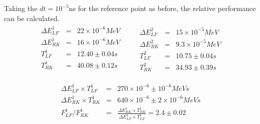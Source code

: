 \documentclass[a4paper,oneside,12pt]{report}
\numberwithin{equation}{chapter}
\begin{document}
Taking the $dt=10^{-5}$ns for the reference point as before, the relative performance can be calculated.
\begin{eqnarray*}
    \begin{aligned}
        \Delta E_{LF}^1 &=& 22 \times 10^{-6} MeV \\
        \Delta E_{RK}^1 &=& 16 \times 10^{-6} MeV \\
        T_{LF}^1 &=& 12.40 \pm 0.04 s \\
        T_{RK}^1 &=& 40.08 \pm 0.12 s \\
    \end{aligned}
    \qquad
    \begin{aligned}
        \Delta E_{LF}^2 &=& 15 \times 10^{-5} MeV \\
        \Delta E_{RK}^2 &=& 9.3 \times 10^{-5} MeV \\
        T_{LF}^2 &=& 10.75 \pm 0.04 s \\
        T_{RK}^2 &=& 34.93 \pm 0.39 s 
    \end{aligned}
\end{eqnarray*}

\begin{eqnarray} \label{eq:f_lf_rk_1}
    \Delta E_{LF}^1 \times T_{LF}^1 &=& 270 \times 10^{-6} \pm 10^{-6} MeV s \nonumber\\ %
    \Delta E_{RK}^1 \times T_{RK}^1 &=& 640 \times 10^{-6} \pm 2\times 10^{-6}  MeV s \nonumber\\ %
    F_{LF}^1/F_{RK}^1 &=& \frac{\Delta E_{RK}^1 \times T_{RK}^1 }{\Delta E_{LF}^1 \times T_{LF}^1} = 2.4 \pm 0.02
\end{eqnarray}
\end{document}
